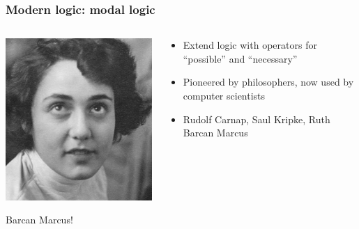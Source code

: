 \begin{frame}
  \frametitle{Modern logic: modal logic}

  \begin{columns}
    \begin{column}{.5\textwidth}
      \includegraphics[height=.8\textheight]{../assets/barcan}
      
      Barcan Marcus!
    \end{column}
    \begin{column}{.5\textwidth}
      \begin{itemize}[<+->]
        \item Extend logic with operators for ``possible'' and ``necessary''
        \item Pioneered by philosophers, now used by computer scientists
        \item Rudolf Carnap, Saul Kripke, Ruth Barcan Marcus
      \end{itemize}
    \end{column}
  \end{columns}
\end{frame}

\fi 


